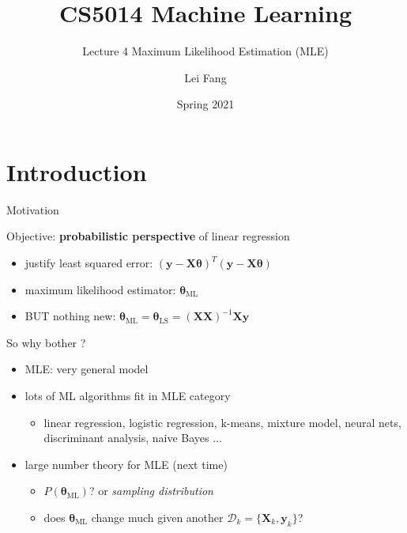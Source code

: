 \documentclass[ignorenonframetext,]{beamer}
\title{CS5014 Machine Learning}
\subtitle{Lecture 4 Maximum Likelihood Estimation (MLE)}
\author{Lei Fang}
\date{Spring 2021}
\providecommand{\tightlist}{%
  \setlength{\itemsep}{0pt}\setlength{\parskip}{0pt}}
\newcommand{\vv}[1]{\boldsymbol{#1}}
\begin{document}
\frame{\titlepage}

\hypertarget{introduction}{%
\section{Introduction}\label{introduction}}

\begin{frame}{Motivation}
\protect\hypertarget{motivation}{}

Objective: \textbf{probabilistic perspective} of linear regression

\begin{itemize}
\tightlist
\item
  justify least squared error:
  \((\vv{y} - \vv{X\theta})^T(\vv{y}-\vv{X\theta})\)
\item
  maximum likelihood estimator: \(\vv{\theta}_{\text{ML}}\)
\item
  BUT nothing new:
  \(\vv{\theta}_{\text{ML}} = \vv{\theta}_{\text{LS}} = (\vv{XX})^{-1}\vv{Xy}\)
\end{itemize}

\bigskip 
\pause

So why bother ?

\begin{itemize}
\tightlist
\item
  MLE: very general model
\item
  lots of ML algorithms fit in MLE category

  \begin{itemize}
  \tightlist
  \item
    linear regression, logistic regression, k-means, mixture model,
    neural nets, discriminant analysis, naive Bayes \(\ldots\)
  \end{itemize}
\item
  large number theory for MLE (next time)

  \begin{itemize}
  \tightlist
  \item
    \(P(\vv{\theta}_{\text{ML}})\)? or \emph{sampling distribution}
  \item
    does \(\vv{\theta}_{\text{ML}}\) change much given another
    \(\mathcal{D}_k = \{\vv{X}_k,\vv{y}_k\}\)?
  \end{itemize}
\end{itemize}

\end{frame}
\end{document}
